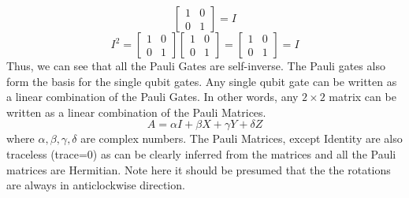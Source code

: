\begin{importantnote}
\[\begin{bmatrix}
        1 & 0 \\
        0 & 1
    \end{bmatrix}=I
\]
\[
    I^2=\begin{bmatrix}
        1 & 0 \\
        0 & 1
    \end{bmatrix}\begin{bmatrix}
        1 & 0 \\
        0 & 1
    \end{bmatrix}=\begin{bmatrix}
        1 & 0 \\
        0 & 1
    \end{bmatrix}=I
\]
Thus, we can see that all the Pauli Gates are self-inverse.
The Pauli gates also form the basis for the single qubit gates. Any single qubit gate can be written as a linear combination of the Pauli Gates.
In other words, any $2 \times 2$ matrix can be written as a linear combination of the Pauli Matrices.
\[
    A=\alpha I+\beta X+\gamma Y+\delta Z
\]
where $\alpha,\beta,\gamma,\delta$ are complex numbers. The Pauli Matrices, except Identity are also traceless (trace=0) as can be clearly inferred from the matrices and all the Pauli matrices are Hermitian.
Note here it should be presumed that the the rotations are always in anticlockwise direction.
\end{importantnote}
